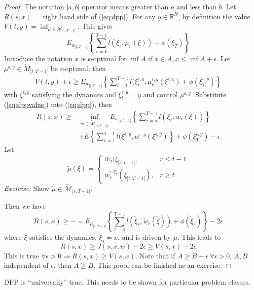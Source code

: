 \begin{proof}
The notation $]a,b[$ operator means greater than $a$ and less than $b$. Let $R(s,x) = $ right hand side of (\ref{eq:dpp}). For any $y\in\mathbb{R}^N$, by definition the value $V(t,y) = \inf_{\mu\in\mathcal{M}_{]t,T-1[}}$. This gives
$$E_{w_{]t,T-1[}}\left\lbrace \sum_{r=k}^{T-1}l(\xi_r,\mu_r(\xi))+\phi(\xi_T)\right\rbrace$$
Introduce the notation $x$ is $\epsilon$-optimal for $\inf A$ if $x\in A, x\leq\inf A+\epsilon$. Let $\mu^{\epsilon,y}\in\tilde{M}_{]t,T-1[}$ be $\epsilon$-optimal, then
\begin{align}
\label{eq:dppvalue}
V(t,y) + \epsilon\geq E_{w_{]t,T-1[}}\left\lbrace \sum_{r=t}^{T-1}l(\xi_r^{\epsilon,y}, \mu_r^{\epsilon,y}(\xi^{\epsilon,y}) + \phi(\xi_T^{\epsilon,y})\right\rbrace
\end{align}
with $\xi^{\epsilon,y}$ satisfying the dynamics and $\xi_t^{\epsilon,y} = y$ and control $\mu^{\epsilon,y}$. Substitute (\ref{eq:dppvalue}) into (\ref{eq:dpp}), then
\begin{align*}
R(s,x) \geq &\inf_{w\in\tilde{\mathcal{M}}_{]s,t-1[}} E_{w_{]s,t-1[}}\left\lbrace \sum_{r=s}^{T-1}l(\xi_r,w_r(\xi))\right\rbrace \\
&+ E\left\lbrace \sum_{r=t}^{T-1}l(\xi^{\epsilon,y},w^{\epsilon,y}(\xi^{\epsilon,y})\right\rbrace + \phi(\xi_T^{\epsilon,y}) - \epsilon
\end{align*}
Let
$$\tilde{\mu}(\xi) = \begin{cases} \bar{w}_2(\xi_{]s,t-1[}, & r\leq t-1 \\ w_r^{\epsilon,\xi_\tau}(\xi_{]t,T-1[}), & r\geq t \end{cases}$$
\textit{Exercise:} Show $\tilde{\mu}\in\tilde{\mathcal{M}}_{]s,T-1[}$.

Then we have
$$R(s,x) \geq \cdots = E_{\mu_{]s,T-1[}}\left\lbrace\sum_{r=s}^{T-1} l(\tilde{\xi}_r,\tilde{w}_r(\tilde{\xi})) + \phi(\tilde{\xi}_r)\right\rbrace - 2\epsilon$$
where $\tilde{\xi}$ satisfies the dynamics, $\tilde{\xi}_s=x$, and is driven by $\tilde{\mu}$. This leads to
$$R(s,x) \geq J(s,x,\tilde{w}) - 2\epsilon \geq V(s,x)-2\epsilon$$
This is true $\forall \epsilon>0\Rightarrow R(s,x)\geq V(s,x)$. Note that if $A\geq B-\epsilon ~\forall \epsilon > 0$, $A,B$ independent of $\epsilon$, then $A\geq B$. This proof can be finished as an exercise.
\end{proof}

DPP is ``universally'' true. This needs to be shown for particular problem classes.

